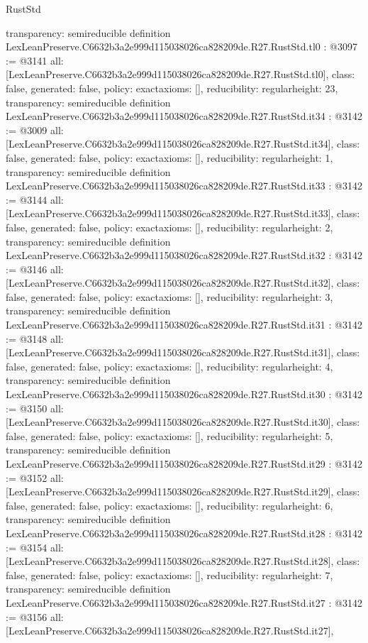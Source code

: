 \begin{lexlean}{RustStd}
\begin{coremodule}
{  transparency: semireducible
}
definition LexLeanPreserve.C6632b3a2e999d115038026ca828209de.R27.RustStd.tl0 : @3097 := @3141 {
  all: [LexLeanPreserve.C6632b3a2e999d115038026ca828209de.R27.RustStd.tl0],
  class: false,
  generated: false,
  policy: exact{axioms: []},
  reducibility: regular{height: 23},
  transparency: semireducible
}
definition LexLeanPreserve.C6632b3a2e999d115038026ca828209de.R27.RustStd.it34 : @3142 := @3009 {
  all: [LexLeanPreserve.C6632b3a2e999d115038026ca828209de.R27.RustStd.it34],
  class: false,
  generated: false,
  policy: exact{axioms: []},
  reducibility: regular{height: 1},
  transparency: semireducible
}
definition LexLeanPreserve.C6632b3a2e999d115038026ca828209de.R27.RustStd.it33 : @3142 := @3144 {
  all: [LexLeanPreserve.C6632b3a2e999d115038026ca828209de.R27.RustStd.it33],
  class: false,
  generated: false,
  policy: exact{axioms: []},
  reducibility: regular{height: 2},
  transparency: semireducible
}
definition LexLeanPreserve.C6632b3a2e999d115038026ca828209de.R27.RustStd.it32 : @3142 := @3146 {
  all: [LexLeanPreserve.C6632b3a2e999d115038026ca828209de.R27.RustStd.it32],
  class: false,
  generated: false,
  policy: exact{axioms: []},
  reducibility: regular{height: 3},
  transparency: semireducible
}
definition LexLeanPreserve.C6632b3a2e999d115038026ca828209de.R27.RustStd.it31 : @3142 := @3148 {
  all: [LexLeanPreserve.C6632b3a2e999d115038026ca828209de.R27.RustStd.it31],
  class: false,
  generated: false,
  policy: exact{axioms: []},
  reducibility: regular{height: 4},
  transparency: semireducible
}
definition LexLeanPreserve.C6632b3a2e999d115038026ca828209de.R27.RustStd.it30 : @3142 := @3150 {
  all: [LexLeanPreserve.C6632b3a2e999d115038026ca828209de.R27.RustStd.it30],
  class: false,
  generated: false,
  policy: exact{axioms: []},
  reducibility: regular{height: 5},
  transparency: semireducible
}
definition LexLeanPreserve.C6632b3a2e999d115038026ca828209de.R27.RustStd.it29 : @3142 := @3152 {
  all: [LexLeanPreserve.C6632b3a2e999d115038026ca828209de.R27.RustStd.it29],
  class: false,
  generated: false,
  policy: exact{axioms: []},
  reducibility: regular{height: 6},
  transparency: semireducible
}
definition LexLeanPreserve.C6632b3a2e999d115038026ca828209de.R27.RustStd.it28 : @3142 := @3154 {
  all: [LexLeanPreserve.C6632b3a2e999d115038026ca828209de.R27.RustStd.it28],
  class: false,
  generated: false,
  policy: exact{axioms: []},
  reducibility: regular{height: 7},
  transparency: semireducible
}
definition LexLeanPreserve.C6632b3a2e999d115038026ca828209de.R27.RustStd.it27 : @3142 := @3156 {
  all: [LexLeanPreserve.C6632b3a2e999d115038026ca828209de.R27.RustStd.it27],
}
\end{coremodule}
\end{lexlean}

